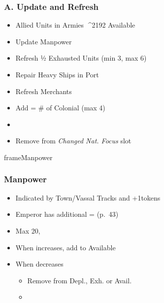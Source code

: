 \documentclass[10pt]{article}
\newlength{\fhManpower} \setlength\fhManpower{9\baselineskip}
\begin{document}
\subsubsection*{A. Update and Refresh}
\begin{itemize}
	\item Allied Units in Armies ^^^^2192 Available \manpower
	\item {}Update Manpower
	\item Refresh ½ Exhausted Units (min 3, max 6)
	\item Repair Heavy Ships in Port
	\item Refresh Merchants
	\item Add \colonists = \# of Colonial \claims (max 4)
	\item {}
	\item Remove \cube from \emph{Changed Nat. Focus} slot
\end{itemize}
\begin{dynamiccontents*}{frameManpower}\begin{eubox}{\fhManpower}
	\subsubsection*{Manpower }
	\begin{itemize}
		\item Indicated by Town/Vassal Tracks and +1\manpower tokens
		\item Emperor has additional \manpower = \authority (p.~43)
		\item Max 20, 
		\item When increases, add to Available \manpower
		\item When decreases
		\begin{itemize}
			\item Remove from Depl., Exh. or Avail. \manpower
			\item {}
		\end{itemize}
	\end{itemize}
\end{eubox}\end{dynamiccontents*}
\end{document}
